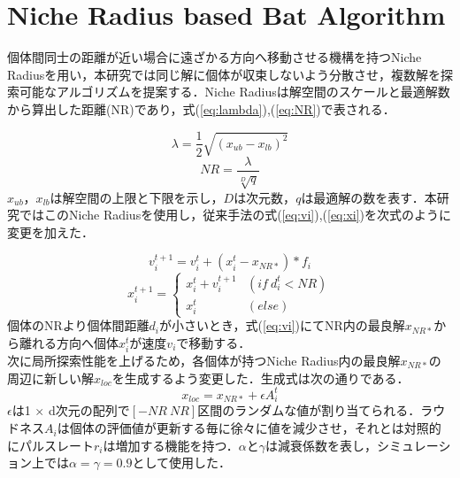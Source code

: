 \documentclass[twocolumn, a4paper]{UECIEresume}
\begin{document}
\section{Niche Radius based Bat Algorithm}
個体間同士の距離が近い場合に遠ざかる方向へ移動させる機構を持つNiche Radius\cite{niche}を用い，本研究では同じ解に個体が収束しないよう分散させ，複数解を探索可能なアルゴリズムを提案する．Niche Radiusは解空間のスケールと最適解数から算出した距離(NR)であり，式(\ref{eq:lambda}),(\ref{eq:NR})で表される．

\begin{equation}
\label{eq:lambda}
\lambda =\frac{1}{2} \sqrt{(x_{ub}-x_{lb})^2}
\end{equation}
\begin{equation}
\label{eq:NR}
NR=\frac{\lambda}{\sqrt[D]{q}}
\end{equation}
$x_{ub}$，${x_{lb}}$は解空間の上限と下限を示し，${D}$は次元数，$q$は最適解の数を表す．本研究ではこのNiche Radiusを使用し，従来手法の式(\ref{eq:vi}),(\ref{eq:xi})を次式のように変更を加えた．

\begin{equation}
\label{eq:vi}
v_i^{t+1}=v_i^t+(x_i^t-x_{NR*})*f_i
\end{equation}
\begin{equation}
\label{eq:xi}
x_i^{t+1}= \begin{cases}
x_i^t+v_i^{t+1} & (if \ d_i^t < NR) \\
x_i^t & (else)
\end{cases}
\end{equation}
個体のNRより個体間距離${d_i}$が小さいとき，式(\ref{eq:vi})にてNR内の最良解${x_{NR*}}$から離れる方向へ個体${x_i^t}$が速度${v_i}$で移動する． \\
次に局所探索性能を上げるため，各個体が持つNiche Radius内の最良解${x_{NR*}}$の周辺に新しい解${x_{loc}}$を生成するよう変更した．生成式は次の通りである．
\begin{equation}
\label{eq:loc}
x_{loc}=x_{NR*} + \epsilon A_i^t
\end{equation}
$\epsilon$は1 $\times$ d次元の配列で$[-NR \ NR]$区間のランダムな値が割り当てられる．ラウドネス$A_i$は個体の評価値が更新する毎に徐々に値を減少させ，それとは対照的にパルスレート$r_i$は増加する機能を持つ．$\alpha$と$\gamma$は減衰係数を表し，シミュレーション上では$\alpha = \gamma = 0.9$として使用した．
\end{document}
